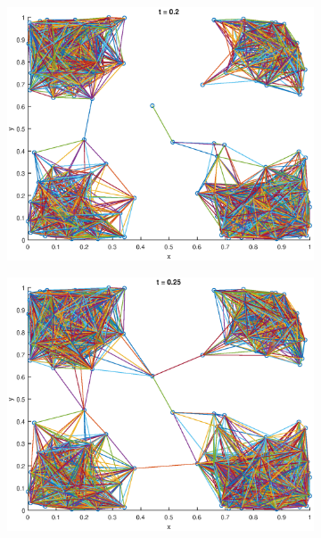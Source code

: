 \documentclass[10pt]{article}
\begin{document}
\begin{figure}
\begin{subfigure}[b]{.49\textwidth}
	   	\includegraphics[width=\columnwidth]{Ass1_20.eps}
	   	\caption{}
	   	\label{fig1e}
	\end{subfigure}
	\begin{subfigure}[b]{.49\textwidth}
		\includegraphics[width=\columnwidth]{Ass1_25.eps}
		\caption{}
		\label{fig1f}
	\end{subfigure}	
  \label{fig1.1}
\end{figure}

\section{}
\end{document}
